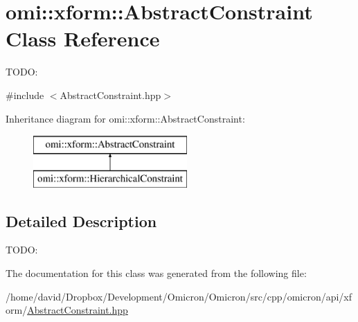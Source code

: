 \hypertarget{classomi_1_1xform_1_1_abstract_constraint}{}\section{omi\+:\+:xform\+:\+:Abstract\+Constraint Class Reference}
\label{classomi_1_1xform_1_1_abstract_constraint}


T\+O\+DO\+:  




{\ttfamily \#include $<$Abstract\+Constraint.\+hpp$>$}

Inheritance diagram for omi\+:\+:xform\+:\+:Abstract\+Constraint\+:\begin{figure}[H]
\begin{center}
\leavevmode
\includegraphics[height=2.000000cm]{classomi_1_1xform_1_1_abstract_constraint}
\end{center}
\end{figure}


\subsection{Detailed Description}
T\+O\+DO\+: 

The documentation for this class was generated from the following file\+:\begin{DoxyCompactItemize}
\item 
/home/david/\+Dropbox/\+Development/\+Omicron/\+Omicron/src/cpp/omicron/api/xform/\hyperlink{_abstract_constraint_8hpp}{Abstract\+Constraint.\+hpp}\end{DoxyCompactItemize}
